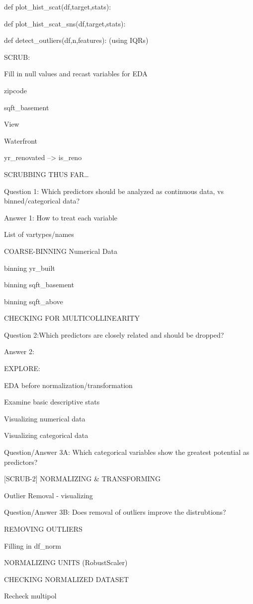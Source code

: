 \documentclass[11pt]{article}
\begin{document}
{def plot\_hist\_scat(df,target,stats):}

{def plot\_hist\_scat\_sns(df,target,stats):}

{def detect\_outliers(df,n,features): (using IQRs)}

{SCRUB:}

{Fill in null values and recast variables for EDA}

{zipcode}

{sqft\_basement}

{View}

{Waterfront}

{yr\_renovated --\textgreater{} is\_reno}

{SCRUBBING THUS FAR\ldots{}}

{Question 1: Which predictors should be analyzed as continuous data, vs
binned/categorical data?}

{Answer 1: How to treat each variable}

{List of vartypes/names}

{COARSE-BINNING Numerical Data}

{binning yr\_built}

{binning sqft\_basement}

{binning sqft\_above}

{CHECKING FOR MULTICOLLINEARITY}

{Question 2:Which predictors are closely related and should be dropped?}

{Answer 2:}

{EXPLORE:}

{EDA before normalization/transformation}

{Examine basic descriptive stats}

{Visualizing numerical data}

{Visualizing categorical data}

{Question/Answer 3A: Which categorical variables show the greatest
potential as predictors?}

{{[}SCRUB-2{]} NORMALIZING \& TRANSFORMING}

{Outlier Removal - visualizing}

{Question/Answer 3B: Does removal of outliers improve the distrubtions?}

{REMOVING OUTLIERS}

{Filling in df\_norm}

{NORMALIZING UNITS (RobustScaler)}

{CHECKING NORMALIZED DATASET}

{Recheck multipol}
\end{document}
